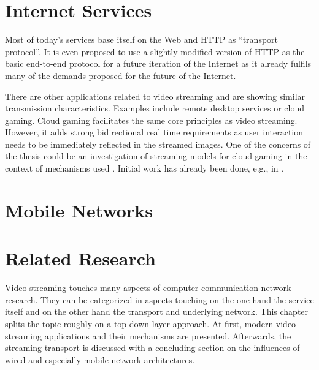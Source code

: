 


\section{Internet Services}


Most of today's services base itself on the Web and HTTP as ``transport protocol''. It is even proposed to use
a slightly modified version of HTTP as the basic end-to-end protocol for a future iteration of the Internet\cite{Popa:2010:HNW:1868447.1868453} as it already fulfils many of the demands proposed for the future of the Internet.


There are other applications related to video streaming and are showing similar transmission characteristics. Examples include remote desktop services or cloud gaming. Cloud gaming facilitates the same core principles as video streaming. However, it adds strong bidirectional real time requirements as user interaction needs to be immediately reflected in the streamed images. One of the concerns of the thesis could be an investigation of streaming models for cloud gaming in the context of mechanisms used . Initial work has already been done, e.g., in \cite{4795441,wang2009modeling,jarschel2011cloudevaluation,ct2010wolken}.



\section{Mobile Networks}



\section{Related Research}

Video streaming touches many aspects of computer communication network research. They can be categorized in aspects touching on the one hand the service itself and on the other hand  the transport and underlying network. This chapter splits the topic roughly on a top-down layer approach. At first, modern video streaming applications and their mechanisms are presented. Afterwards, the streaming transport is discussed with a concluding section on the influences of wired and especially mobile network architectures.



